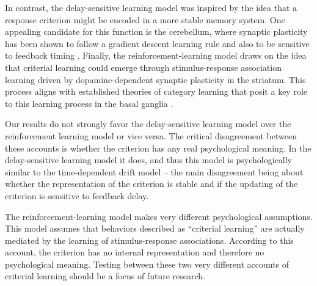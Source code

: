 \documentclass[doc, floatsintext]{apa7}
\begin{document}
In contrast, the delay-sensitive learning model was inspired
by the idea that a response criterion might be encoded in a
more stable memory system. One appealing candidate for this
function is the cerebellum, where synaptic plasticity has
been shown to follow a gradient descent learning rule and
also to be sensitive to feedback timing
\parencite{brudner2016delayed, held_adaptation_1966,
honda_adaptation_2012, kitazawa_effects_1995,
kitazawa_prism_2002}.  Finally, the reinforcement-learning
model draws on the idea that criterial learning could emerge
through stimulus-response association learning driven by
dopamine-dependent synaptic plasticity in the striatum. This
process aligns with established theories of category
learning that posit a key role to this learning process in
the basal ganglia \cite{AshbyCOVIS1998}.

Our results do not strongly favor the delay-sensitive
learning model over the reinforcement learning model or vice
versa. The critical disagreement between these accounts is
whether the criterion has any real psychological meaning. In
the delay-sensitive learning model it does, and thus this
model is psychologically similar to the time-dependent drift
model -- the main disagreement being about whether the
representation of the criterion is stable and if the
updating of the criterion is sensitive to feedback delay.

The reinforcement-learning model makes very different
psychological assumptions. This model assumes that behaviors
described as ``criterial learning'' are actually mediated by
the learning of stimulus-response associations. According to
this account, the criterion has no internal representation
and therefore no psychological meaning. Testing between
these two very different accounts of criterial learning
should be a focus of future research. 
\end{document}
